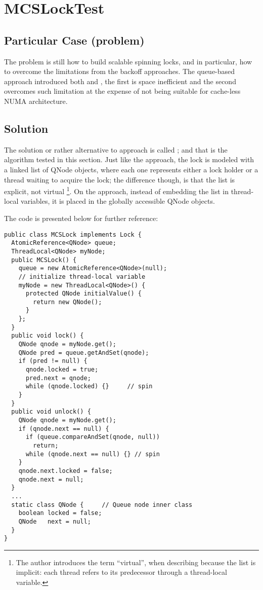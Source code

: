 \section{\textbf{MCSLockTest}}

\subsection{Particular Case (problem)}
The problem is still how to build scalable spinning locks, and in
particular, how to overcome the limitations from the backoff
approaches. The queue-based approach introduced both  and
, the first is space inefficient and the second overcomes
such limitation at the expense of not being suitable for cache-less
NUMA architecture.

\subsection{Solution}
The solution or rather alternative to  approach is called
; and that is the algorithm tested in this section. Just
like the  approach, the lock is modeled with a linked
list of QNode objects, where each one represents either a lock holder
or a thread waiting to acquire the lock; the difference though, is
that the list is explicit, not virtual \footnote{The author introduces
  the term ``virtual'', when describing  because the
list is implicit: each thread refers to its predecessor through a
thread-local  variable.}. On the  approach, instead of
embedding the list in thread-local variables, it is placed in the
globally accessible QNode objects.

The  code is presented below for further reference: \\

\begin{lstlisting}[style=numbers]
public class MCSLock implements Lock {
  AtomicReference<QNode> queue;
  ThreadLocal<QNode> myNode;
  public MCSLock() {
    queue = new AtomicReference<QNode>(null);
    // initialize thread-local variable
    myNode = new ThreadLocal<QNode>() {
      protected QNode initialValue() {
        return new QNode();
      }
    };
  }
  public void lock() {
    QNode qnode = myNode.get();
    QNode pred = queue.getAndSet(qnode);
    if (pred != null) {
      qnode.locked = true;
      pred.next = qnode;
      while (qnode.locked) {}     // spin
    }
  }
  public void unlock() {
    QNode qnode = myNode.get();
    if (qnode.next == null) {
      if (queue.compareAndSet(qnode, null))
        return;
      while (qnode.next == null) {} // spin
    }
    qnode.next.locked = false;
    qnode.next = null;
  }
  ...
  static class QNode {     // Queue node inner class
    boolean locked = false;
    QNode   next = null;
  }
}
\end{lstlisting}
\hfill

